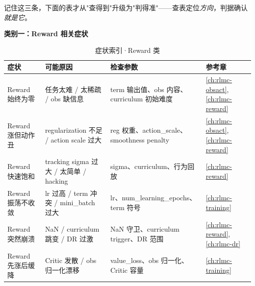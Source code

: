 
记住这三条，下面的表才从"查得到"升级为"判得准"——查表定位\emph{方向}，判据确认\emph{就是它}。

\textbf{类别一：Reward 相关症状}

\begin{table}[H]
\centering
\caption{症状索引·Reward 类}
\label{tab:rlmc-diag-idx-reward}
\begin{tabular}{p{3.4cm}p{3.8cm}p{3.4cm}p{2.0cm}}
\hline
症状 & 可能原因 & 检查参数 & 参考章 \\
\hline
Reward 始终为零 & 任务太难 / 太稀疏 / obs 缺信息 & term 输出值、obs 内容、curriculum 初始难度 & \cref{ch:rlmc-obsact},\cref{ch:rlmc-reward} \\
Reward 涨但动作丑 & regularization 不足 / action scale 过大 & reg 权重、action\_scale、smoothness penalty & \cref{ch:rlmc-obsact},\cref{ch:rlmc-reward} \\
Reward 快速饱和 & tracking sigma 过大 / 太简单 / hacking & sigma、curriculum、行为回放 & \cref{ch:rlmc-reward} \\
Reward 振荡不收敛 & lr 过高 / term 冲突 / mini\_batch 过大 & lr、num\_learning\_epochs、term 符号 & \cref{ch:rlmc-training} \\
Reward 突然崩溃 & NaN / curriculum 跳变 / DR 过激 & NaN 守卫、curriculum trigger、DR 范围 & \cref{ch:rlmc-reward},\cref{ch:rlmc-dr} \\
Reward 先涨后缓降 & Critic 发散 / obs 归一化漂移 & value\_loss、obs 归一化、Critic 容量 & \cref{ch:rlmc-training} \\
\hline
\end{tabular}
\end{table}

